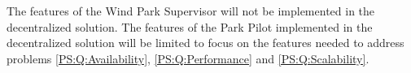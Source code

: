 The features of the Wind Park Supervisor will not be implemented in the decentralized solution. The features of the Park Pilot implemented in the decentralized solution will be limited to focus on the features needed to address problems \ref{PS:Q:Availability}, \ref{PS:Q:Performance} and \ref{PS:Q:Scalability}.

%
%	
%
%



